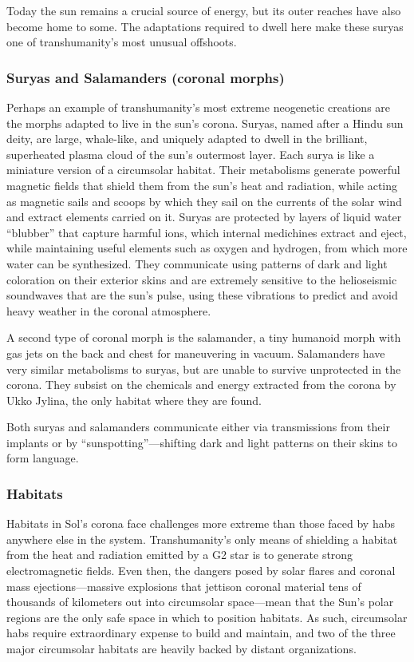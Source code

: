 Today the sun remains a crucial source of energy, but its outer reaches have also become home to some. The adaptations required to dwell here make these suryas one of transhumanity's most unusual offshoots. 

\subsubsection{Suryas and Salamanders (coronal morphs)} \label{sec:sury-salam-coron} 

Perhaps an example of transhumanity's most extreme neogenetic creations are the morphs adapted to live in the sun's corona. Suryas, named after a Hindu sun deity, are large, whale-like, and uniquely adapted to dwell in the brilliant, superheated plasma cloud of the sun's outermost layer. Each surya is like a miniature version of a circumsolar habitat. Their metabolisms generate powerful magnetic fields that shield them from the sun's heat and radiation, while acting as magnetic sails and scoops by which they sail on the currents of the solar wind and extract elements carried on it. Suryas are protected by layers of liquid water “blubber” that capture harmful ions, which internal medichines extract and eject, while maintaining useful elements such as oxygen and hydrogen, from which more water can be synthesized. They communicate using patterns of dark and light coloration on their exterior skins and are extremely sensitive to the helioseismic soundwaves that are the sun's pulse, using these vibrations to predict and avoid heavy weather in the coronal atmosphere. 

A second type of coronal morph is the salamander, a tiny humanoid morph with gas jets on the back and chest for maneuvering in vacuum. Salamanders have very similar metabolisms to suryas, but are unable to survive unprotected in the corona. They subsist on the chemicals and energy extracted from the corona by Ukko Jylina, the only habitat where they are found. 

Both suryas and salamanders communicate either via transmissions from their implants or by “sunspotting”—shifting dark and light patterns on their skins to form language. 

\subsubsection{Habitats} \label{sec:habitats-1} 

Habitats in Sol's corona face challenges more extreme than those faced by habs anywhere else in the system. Transhumanity's only means of shielding a habitat from the heat and radiation emitted by a G2 star is to generate strong electromagnetic fields. Even then, the dangers posed by solar flares and coronal mass ejections—massive explosions that jettison coronal material tens of thousands of kilometers out into circumsolar space—mean that the Sun's polar regions are the only safe space in which to position habitats. As such, circumsolar habs require extraordinary expense to build and maintain, and two of the three major circumsolar habitats are heavily backed by distant organizations. 


